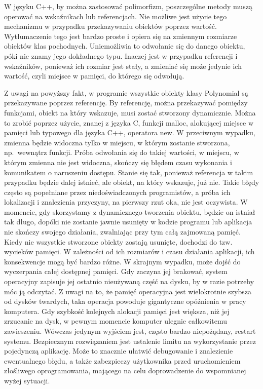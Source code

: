 \documentclass[oneside,a4paper]{book}
\begin{document}
	W języku C++, by można zastosować polimorfizm, poszczególne metody muszą operować na wskaźnikach lub referencjach. Nie możliwe jest użycie tego mechanizmu w przypadku przekazywaniu obiektów poprzez wartość. Wytłumaczenie tego jest bardzo proste i opiera się na zmiennym rozmiarze obiektów klas pochodnych. Uniemożliwia to odwołanie się do danego obiektu, póki nie znamy jego dokładnego typu. Inaczej jest w przypadku referencji i wskaźników, ponieważ ich rozmiar jest stały, a zmieniać się może jedynie ich wartość, czyli miejsce w pamięci, do którego się odwołują.
	
	Z uwagi na powyższy fakt, w programie wszystkie obiekty klasy Polynomial są przekazywane poprzez referencję. By referencję, można przekazywać pomiędzy funkcjami, obiekt na który wskazuje, musi zostać stworzony dynamicznie. Można to zrobić poprzez użycie, znanej z języka C, funkcji malloc, alokującej miejsce w pamięci lub typowego dla języka C++, operatora new. W przeciwnym wypadku, zmienna będzie widoczna tylko w miejscu, w którym zostanie stworzona, np.\ wewnątrz funkcji. Próba odwołania się do takiej wartości, w miejscu, w którym zmienna nie jest widoczna, skończy się błędem czasu wykonania i komunikatem o naruszeniu dostępu. Stanie się tak, ponieważ referencja w takim przypadku będzie dalej istnieć, ale obiekt, na który wskazuje, już nie. Takie błędy często są popełniane przez niedoświadczonych programistów, a próba ich lokalizacji i znalezienia przyczyny, na pierwszy rzut oka, nie jest oczywista. W momencie, gdy skorzystamy z dynamicznego tworzenia obiektu, będzie on istniał tak długo, dopóki nie zostanie jawnie usunięty w kodzie programu lub aplikacja nie skończy swojego działania, zwalniając przy tym całą zajmowaną pamięć. Kiedy nie wszystkie stworzone obiekty zostają usunięte, dochodzi do tzw. wycieków pamięci. W zależności od ich rozmiarów i czasu działania aplikacji, ich konsekwencje mogą być bardzo różne. W skrajnym wypadku, może dojść do wyczerpania całej dostępnej pamięci. Gdy zaczyna jej brakować, system operacyjny zapisuje jej ostatnio nieużywaną część na dysku, by w razie potrzeby móc ją odczytać. Z uwagi na to, że pamięć operacyjna jest wielokrotnie szybsza od dysków twardych, taka operacja powoduje gigantyczne opóźnienia w pracy komputera. Gdy szybkość kolejnych alokacji pamięci jest większa, niż jej zrzucanie na dysk, w pewnym momencie komputer ulegnie całkowitemu zawieszeniu. Wówczas jedynym wyjściem jest, często bardzo niepożądany, restart systemu. Bezpiecznym rozwiązaniem jest ustalenie limitu na wykorzystanie przez pojedynczą aplikację. Może to znacznie ułatwić debugowanie i znalezienie ewentualnego błędu, a także zabezpieczy użytkownika przed uruchomieniem złośliwego oprogramowania, mającego na celu doprowadzenie do wspomnianej wyżej sytuacji.
	
\end{document}
